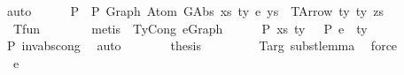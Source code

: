 \begin{isabellebody}
\ auto\isanewline
\isanewline
\ \ \ \ \isamarkupfalse%
\ P{}{\isacharcolon}{\kern0pt}\ {\isachardoublequoteopen}{\isasymGamma}\ {\isasymturnstile}{\isacharbraceleft}{\kern0pt}P{\isacharbraceright}{\kern0pt}\ {\isacharparenleft}{\kern0pt}Graph\ {\isacharparenleft}{\kern0pt}Atom\ {\isacharparenleft}{\kern0pt}GAbs\ xs\ ty\ e{\isacharparenright}{\kern0pt}\ ys{\isacharparenright}{\kern0pt}{\isacharparenright}{\kern0pt}\ {\isacharcolon}{\kern0pt}\ TArrow\ ty{}\ ty{}\ zs{\isachardoublequoteclose}\isanewline
\ \ \ \ \ \ \isamarkupfalse%
\ {\isachardoublequoteopen}{}{\isachardoublequoteclose}{\isacharparenleft}{\kern0pt}{}{\isacharparenright}{\kern0pt}\ T{\isacharunderscore}{\kern0pt}fun\isanewline
\ \ \ \ \ \ \isamarkupfalse%
\ {\isacharparenleft}{\kern0pt}metis\ {\isachardoublequoteopen}{}{\isachardoublequoteclose}{\isacharparenleft}{\kern0pt}{}{\isacharparenright}{\kern0pt}\ TyCong\ e{\isacharunderscore}{\kern0pt}Graph{\isacharparenright}{\kern0pt}\isanewline
\ \ \ \ \isamarkupfalse%
\ P{}{\isacharcolon}{\kern0pt}\ {\isachardoublequoteopen}{\isacharparenleft}{\kern0pt}xs{\isacharcomma}{\kern0pt}\ ty{}{\isacharparenright}{\kern0pt}\ {\isacharhash}{\kern0pt}\ {\isasymGamma}\ {\isasymturnstile}{\isacharbraceleft}{\kern0pt}P{\isacharbraceright}{\kern0pt}\ e\ {\isacharcolon}{\kern0pt}\ ty{}{\isachardoublequoteclose}\isanewline
\ \ \ \ \ \ \isamarkupfalse%
\ P{}\ inv{\isacharunderscore}{\kern0pt}abs{\isacharunderscore}{\kern0pt}cong{}\ \isamarkupfalse%
\ auto\isanewline
\ \ \ \ \isamarkupfalse%
\ \isamarkupfalse%
\ {\isacharquery}{\kern0pt}thesis\isanewline
\ \ \ \ \ \ \isamarkupfalse%
\ {\isachardoublequoteopen}{}{\isachardoublequoteclose}{\isacharparenleft}{\kern0pt}{}{\isacharcomma}{\kern0pt}{}{\isacharcomma}{\kern0pt}{}{\isacharcomma}{\kern0pt}{}{\isacharparenright}{\kern0pt}\ T{\isacharunderscore}{\kern0pt}arg\ subst{\isacharunderscore}{\kern0pt}lemma\ \isamarkupfalse%
\ force\isanewline
\ \ \isamarkupfalse%
\isanewline
\ \ \ \ \isamarkupfalse%
\ {\isacharparenleft}{\kern0pt}{}\ e{}{\isacharprime}{\kern0pt}{\isacharparenright}{\kern0pt}\isanewline
\ \ \ \ \isamarkupfalse%
\ \isamarkupfalse%

\end{isabellebody}
